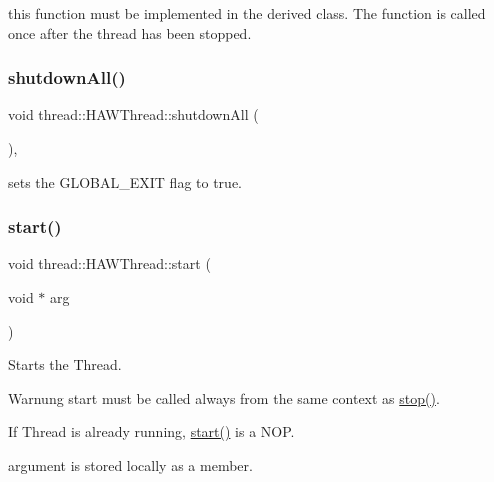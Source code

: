 this function must be implemented in the derived class. The function is called once after the thread has been stopped. \hypertarget{classthread_1_1_h_a_w_thread_a5124385e940aa8d52510a4be10af173c}{}\label{classthread_1_1_h_a_w_thread_a5124385e940aa8d52510a4be10af173c} 
\subsubsection{\texorpdfstring{shutdown\+All()}{shutdownAll()}}
{\footnotesize\ttfamily void thread\+::\+H\+A\+W\+Thread\+::shutdown\+All (\begin{DoxyParamCaption}{ }\end{DoxyParamCaption})\hspace{0.3cm}{\ttfamily [inline]}, {\ttfamily [protected]}}

sets the G\+L\+O\+B\+A\+L\+\_\+\+E\+X\+IT flag to true. \hypertarget{classthread_1_1_h_a_w_thread_ae08d268c337511a1e67fbbeefcb1e89d}{}\label{classthread_1_1_h_a_w_thread_ae08d268c337511a1e67fbbeefcb1e89d} 
\subsubsection{\texorpdfstring{start()}{start()}}
{\footnotesize\ttfamily void thread\+::\+H\+A\+W\+Thread\+::start (\begin{DoxyParamCaption}\item[{void $\ast$}]{arg }\end{DoxyParamCaption})\hspace{0.3cm}{\ttfamily [virtual]}}

Starts the Thread. \begin{DoxyWarning}{Warnung}
start must be called always from the same context as \hyperlink{classthread_1_1_h_a_w_thread_ae8a89c83fd7e9b9a712c19f636ab2638}{stop()}. 

If Thread is already running, \hyperlink{classthread_1_1_h_a_w_thread_ae08d268c337511a1e67fbbeefcb1e89d}{start()} is a N\+OP. \begin{DoxyItemize}
\item argument is stored locally as a member. \end{DoxyItemize}

\end{DoxyWarning}
\hypertarget{classthread_1_1_h_a_w_thread_ae8a89c83fd7e9b9a712c19f636ab2638}{}\label{classthread_1_1_h_a_w_thread_ae8a89c83fd7e9b9a712c19f636ab2638} 
